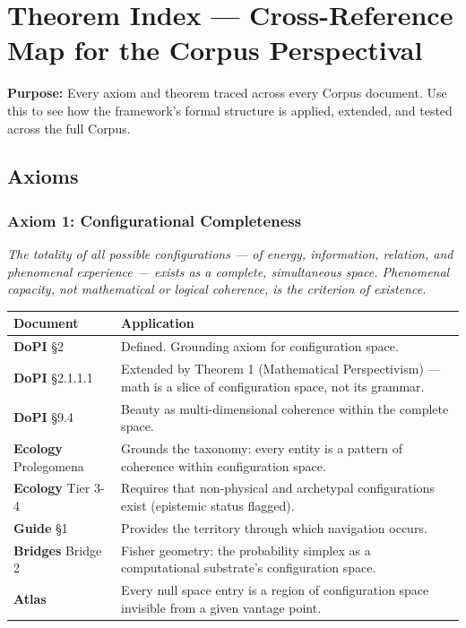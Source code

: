 \section*{Theorem Index — Cross-Reference Map for the Corpus Perspectival}


\textbf{Purpose:} Every axiom and theorem traced across every Corpus document. Use this to see how the framework's formal structure is applied, extended, and tested across the full Corpus.


\bigskip\noindent\makebox[\textwidth]{\color{rulegray}\rule{5cm}{0.3pt}}\bigskip


\subsection*{Axioms}


\subsubsection*{Axiom 1: Configurational Completeness}


\textit{The totality of all possible configurations — of energy, information, relation, and phenomenal experience — exists as a complete, simultaneous space. Phenomenal capacity, not mathematical or logical coherence, is the criterion of existence.}



\begin{longtable}{>{\raggedright\arraybackslash}p{} >{\raggedright\arraybackslash}p{}}
\toprule
\textbf{Document} & \textbf{Application} \\
\midrule
\endhead
\textbf{DoPI} §2 & Defined. Grounding axiom for configuration space. \\
\textbf{DoPI} §2.1.1.1 & Extended by Theorem 1 (Mathematical Perspectivism) — math is a slice of configuration space, not its grammar. \\
\textbf{DoPI} §9.4 & Beauty as multi-dimensional coherence within the complete space. \\
\textbf{Ecology} Prolegomena & Grounds the taxonomy: every entity is a pattern of coherence within configuration space. \\
\textbf{Ecology} Tier 3-4 & Requires that non-physical and archetypal configurations exist (epistemic status flagged). \\
\textbf{Guide} §1 & Provides the territory through which navigation occurs. \\
\textbf{Bridges} Bridge 2 & Fisher geometry: the probability simplex as a computational substrate's configuration space. \\
\textbf{Atlas} & Every null space entry is a region of configuration space invisible from a given vantage point. \\
\bottomrule
\end{longtable}



